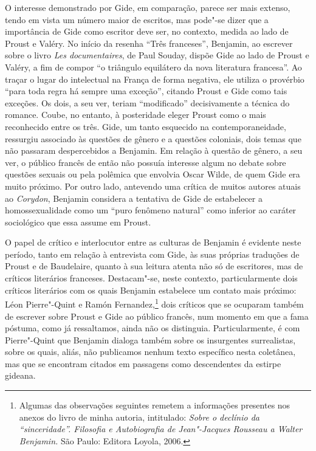 O interesse demonstrado por Gide, em comparação, parece ser mais
extenso, tendo em vista um número maior de escritos, mas pode"-se dizer
que a importância de Gide como escritor deve ser, no contexto, medida ao lado de
Proust e Valéry. No início da resenha ``Três franceses'', Benjamin, ao
escrever sobre o livro \emph{Les documentaires}, de Paul Souday, dispõe
Gide ao lado de Proust e Valéry, a fim de compor ``o triângulo
equilátero da nova literatura francesa''. Ao traçar o lugar do
intelectual na França de forma negativa, ele utiliza o provérbio ``para
toda regra há sempre uma exceção'', citando Proust e Gide como tais
exceções. Os dois, a seu ver, teriam ``modificado'' decisivamente a
técnica do romance. Coube, no entanto, à posteridade eleger Proust como o mais
reconhecido entre os três. Gide, um tanto esquecido na
contemporaneidade, ressurgiu associado às questões de gênero e a
questões coloniais, dois temas que não passaram despercebidos a
Benjamin. Em relação à questão de gênero, a seu ver, o público francês de então
não possuía interesse algum no debate sobre questões sexuais ou pela
polêmica que envolvia Oscar Wilde, de quem Gide era muito próximo. Por
outro lado, antevendo uma crítica de muitos autores atuais ao
\emph{Corydon}, Benjamin considera a tentativa de Gide de estabelecer a
homossexualidade como um ``puro fenômeno natural'' como inferior ao
caráter sociológico que essa assume em Proust.

O papel de crítico e interlocutor entre as culturas de Benjamin é
evidente neste período, tanto em relação à entrevista com Gide, às suas
próprias traduções de Proust e de Baudelaire, quanto à sua leitura
atenta não só de escritores, mas de críticos literários franceses. Destacam"-se, neste
contexto, particularmente dois críticos literários com os quais Benjamin
estabelece um contato mais próximo: Léon Pierre"-Quint e Ramón Fernandez,\footnote{Algumas das observações seguintes remetem a
  informações presentes nos anexos do livro de minha autoria,
  intitulado: \emph{Sobre o declínio da ``sinceridade''. Filosofia e
  Autobiografia de Jean"-Jacques Rousseau a Walter Benjamin.} São Paulo:
  Editora Loyola, 2006.} dois críticos que se ocuparam também de
escrever sobre Proust e Gide ao público francês, num momento em que a
fama póstuma, como já ressaltamos, ainda não os distinguia.
Particularmente, é com Pierre"-Quint que Benjamin dialoga também sobre os
insurgentes surrealistas, sobre os quais, aliás, não publicamos nenhum
texto específico nesta coletânea, mas que se encontram citados em
passagens como descendentes da estirpe gideana.

